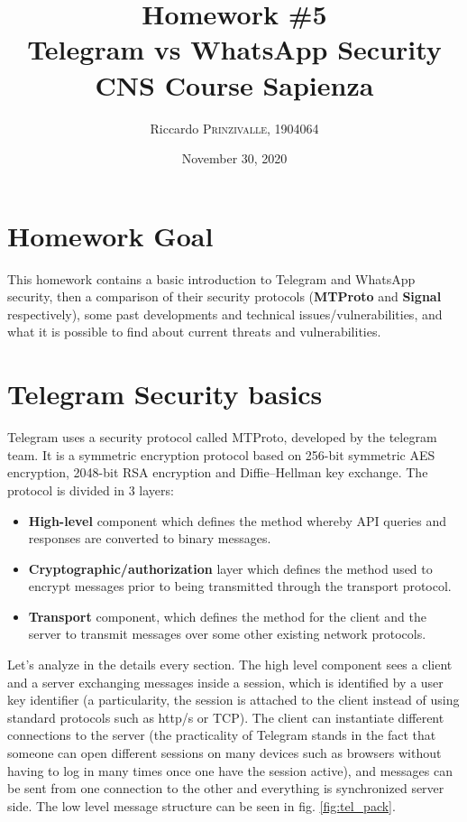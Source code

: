 \documentclass{article}
\title{Homework \#5 \\Telegram vs WhatsApp Security \\[0.2em]\small{}CNS Course Sapienza} %
\author{Riccardo \textsc{Prinzivalle}, 1904064} %
\date{November 30, 2020} %
\begin{document}
\maketitle %


\section{Homework Goal}

This homework contains a basic introduction to Telegram and WhatsApp security, then a comparison of their security protocols (\textbf{MTProto} and \textbf{Signal} respectively), some past developments and technical issues/vulnerabilities, and what it is possible to find about current threats and vulnerabilities.


\section{Telegram Security basics}

Telegram uses a security protocol called MTProto, developed by the telegram team. It is a symmetric encryption protocol based on 256-bit symmetric AES encryption, 2048-bit RSA encryption and Diffie–Hellman key exchange. The protocol is divided in 3 layers:

\begin{itemize}
	\item \textbf{High-level} component which defines the method whereby API queries and responses are converted to binary messages.
	\item  \textbf{Cryptographic/authorization} layer which defines the method used to encrypt messages prior to being transmitted through the transport protocol.
	\item  \textbf{Transport} component, which defines the method for the client and the server to transmit messages over some other existing network protocols.
\end{itemize}

Let's analyze in the details every section. The high level component sees a client and a server exchanging messages inside a session, which is identified by a user key identifier (a particularity, the session is attached to the client instead of using standard protocols such as http/s or TCP). The client can instantiate different connections to the server (the practicality of Telegram stands in the fact that someone can open different sessions on many devices such as browsers without having to log in many times once one have the session active), and messages can be sent from one connection to the other and everything is synchronized server side. The low level message structure can be seen in fig. \ref{fig:tel_pack}.
\end{document}
